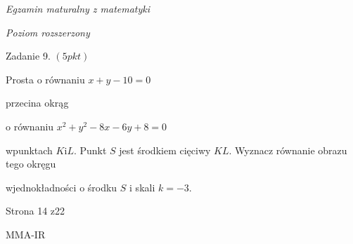 \documentclass[a4paper,12pt]{article}
\begin{document}
{\it Egzamin maturalny z matematyki}

{\it Poziom rozszerzony}

Zadanie 9. $(5pkt)$

Prosta o równaniu $x+y-10=0$

przecina okrąg

o równaniu $x^{2}+y^{2}-8x-6y+8=0$

wpunktach $K\mathrm{i}L$. Punkt $S$ jest środkiem cięciwy $KL$. Wyznacz równanie obrazu tego okręgu

wjednokładności o środku $S$ i skali $k=-3.$

Strona 14 z22

MMA-IR
\end{document}
